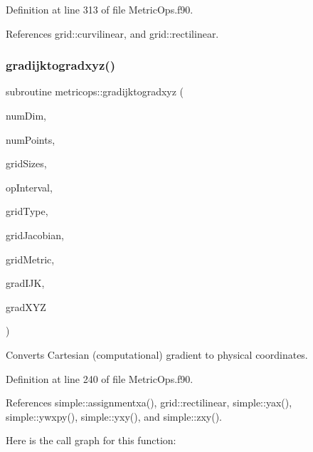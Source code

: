 Definition at line 313 of file Metric\+Ops.\+f90.



References grid\+::curvilinear, and grid\+::rectilinear.

\hypertarget{namespacemetricops_a86a362c463e34f26d3ecc8034aa14cd5}{}\label{namespacemetricops_a86a362c463e34f26d3ecc8034aa14cd5} 
\subsubsection{\texorpdfstring{gradijktogradxyz()}{gradijktogradxyz()}}
{\footnotesize\ttfamily subroutine metricops\+::gradijktogradxyz (\begin{DoxyParamCaption}\item[{integer(kind=4), intent(in)}]{num\+Dim,  }\item[{integer(kind=8), intent(in)}]{num\+Points,  }\item[{integer(kind=8), dimension(numdim), intent(in)}]{grid\+Sizes,  }\item[{integer(kind=8), dimension(2$\ast$numdim), intent(in)}]{op\+Interval,  }\item[{integer(kind=4), intent(in)}]{grid\+Type,  }\item[{real(kind=8), dimension(numpoints), intent(in)}]{grid\+Jacobian,  }\item[{real(kind=8), dimension(numdim$\ast$numdim$\ast$numpoints), intent(in), target}]{grid\+Metric,  }\item[{real(kind=8), dimension(numdim$\ast$numpoints), intent(in), target}]{grad\+I\+JK,  }\item[{real(kind=8), dimension(numdim$\ast$numpoints), intent(out), target}]{grad\+X\+YZ }\end{DoxyParamCaption})}



Converts Cartesian (computational) gradient to physical coordinates. 



Definition at line 240 of file Metric\+Ops.\+f90.



References simple\+::assignmentxa(), grid\+::rectilinear, simple\+::yax(), simple\+::ywxpy(), simple\+::yxy(), and simple\+::zxy().

Here is the call graph for this function\+:
\hypertarget{namespacemetricops_a1ff97a9829721adfee8965698ac1a884}{}\label{namespacemetricops_a1ff97a9829721adfee8965698ac1a884} 
